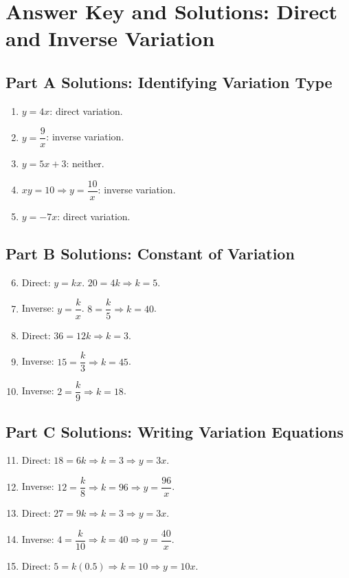 \documentclass[14pt]{extarticle}
\begin{document}
\newpage


\section*{Answer Key and Solutions: Direct and Inverse Variation}

\subsection*{Part A Solutions: Identifying Variation Type}
\begin{enumerate}
  \item \(y=4x\): direct variation.
  \item \(y=\dfrac{9}{x}\): inverse variation.
  \item \(y=5x+3\): neither.
  \item \(xy=10 \Rightarrow y=\dfrac{10}{x}\): inverse variation.
  \item \(y=-7x\): direct variation.
\end{enumerate}

\subsection*{Part B Solutions: Constant of Variation}
\begin{enumerate}
  \setcounter{enumi}{5}
  \item Direct: \(y=kx\). \(20=4k \Rightarrow \boxed{k=5}\).
  \item Inverse: \(y=\dfrac{k}{x}\). \(8=\dfrac{k}{5} \Rightarrow \boxed{k=40}\).
  \item Direct: \(36=12k \Rightarrow \boxed{k=3}\).
  \item Inverse: \(15=\dfrac{k}{3} \Rightarrow \boxed{k=45}\).
  \item Inverse: \(2=\dfrac{k}{9} \Rightarrow \boxed{k=18}\).
\end{enumerate}

\subsection*{Part C Solutions: Writing Variation Equations}
\begin{enumerate}
  \setcounter{enumi}{10}
  \item Direct: \(18=6k \Rightarrow k=3 \Rightarrow \boxed{y=3x}\).
  \item Inverse: \(12=\dfrac{k}{8} \Rightarrow k=96 \Rightarrow \boxed{y=\dfrac{96}{x}}\).
  \item Direct: \(27=9k \Rightarrow k=3 \Rightarrow \boxed{y=3x}\).
  \item Inverse: \(4=\dfrac{k}{10} \Rightarrow k=40 \Rightarrow \boxed{y=\dfrac{40}{x}}\).
  \item Direct: \(5=k(0.5) \Rightarrow k=10 \Rightarrow \boxed{y=10x}\).
\end{enumerate}
\end{document}
